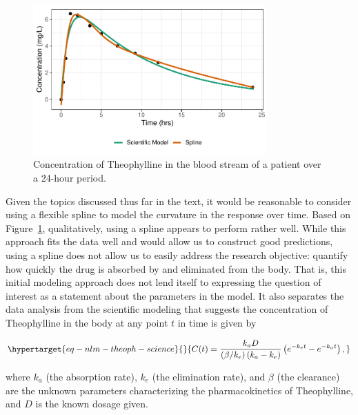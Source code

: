 \documentclass[
  letterpaper,
  DIV=11,
  numbers=noendperiod]{scrreprt}
\theoremstyle{definition}
\theoremstyle{definition}
\theoremstyle{remark}
\begin{document}
\begin{figure}

{\centering \includegraphics[width=0.8\textwidth,height=\textheight]{./images/fig-nlm-theoph-plot-1.pdf}

}

\caption{\label{fig-nlm-theoph-plot}Concentration of Theophylline in the
blood stream of a patient over a 24-hour period.}

\end{figure}

Given the topics discussed thus far in the text, it would be reasonable
to consider using a flexible spline to model the curvature in the
response over time. Based on Figure~\ref{fig-nlm-theoph-plot},
qualitatively, using a spline appears to perform rather well. While this
approach fits the data well and would allow us to construct good
predictions, using a spline does not allow us to easily address the
research objective: quantify how quickly the drug is absorbed by and
eliminated from the body. That is, this initial modeling approach does
not lend itself to expressing the question of interest as a statement
about the parameters in the model. It also separates the data analysis
from the scientific modeling that suggests the concentration of
Theophylline in the body at any point \(t\) in time is given by

\begin{equation}\protect\hypertarget{eq-nlm-theoph-science}{}{C(t) = \frac{k_a D}{\left(\beta/k_e\right)\left(k_a - k_e\right)} \left(e^{-k_e t} - e^{-k_a t}\right),}\label{eq-nlm-theoph-science}\end{equation}

where \(k_a\) (the absorption rate), \(k_e\) (the elimination rate), and
\(\beta\) (the clearance) are the unknown parameters characterizing the
pharmacokinetics of Theophylline, and \(D\) is the known dosage given.
\end{document}

